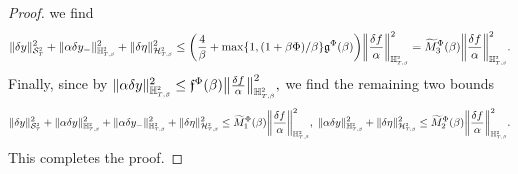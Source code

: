 \documentclass[10pt]{article} %
\newcommand\cH{\mathcal H}
\newcommand\cS{\mathcal S}
\newcommand{\smalltext}[1]{\text{\fontsize{4}{4}\selectfont$#1$}}
\newcommand\ff{\mathfrak f}
\newcommand\fg{\mathfrak g}
\def \H{\mathbb{H}}
\begin{document}
\begin{proof}
	we find
	\begin{equation*}
		\|\delta y\|^2_{\cS^\smalltext{2}_\smalltext{T}} + \|\alpha\delta y_{-}\|^2_{\H^\smalltext{2}_{\smalltext{T}\smalltext{,}\smalltext{\beta}}} + \|\delta\eta\|^2_{\cH^\smalltext{2}_{\smalltext{T}\smalltext{,}\smalltext{\beta}}} \leq \bigg(\frac{4}{\beta} + \max\{1,(1+\beta\Phi)/\beta\}\fg^\Phi(\beta)\bigg) \bigg\|\frac{\delta f}{\alpha}\bigg\|^2_{\H^\smalltext{2}_{\smalltext{T}\smalltext{,}\smalltext{\beta}}} = \widetilde M^\Phi_3(\beta)\bigg\|\frac{\delta f}{\alpha}\bigg\|^2_{\H^\smalltext{2}_{\smalltext{T}\smalltext{,}\smalltext{\beta}}}.
	\end{equation*}
	Finally, since by  $
		\|\alpha \delta y\|^2_{\H^{\smalltext{2}}_{\smalltext{T}\smalltext{,}\smalltext{\beta}}} 
		\leq \ff^\Phi(\beta) \big\| \frac{\delta f}{\alpha} \big\|^2_{\H^{\smalltext{2}}_{\smalltext{T}\smalltext{,}\smalltext{\beta}}},
$
	we find the remaining two bounds
	\begin{equation*}
		\|\delta y\|^2_{\cS^\smalltext{2}_\smalltext{T}} + \|\alpha \delta y\|^2_{\H^{\smalltext{2}}_{\smalltext{T}\smalltext{,}\smalltext{\beta}}} + \|\alpha\delta y_{-}\|^2_{\H^\smalltext{2}_{\smalltext{T}\smalltext{,}\smalltext{\beta}}} + \|\delta\eta\|^2_{\cH^\smalltext{2}_{\smalltext{T}\smalltext{,}\smalltext{\beta}}} 
		\leq \widetilde M^\Phi_1(\beta) \bigg\| \frac{\delta f}{\alpha} \bigg\|^2_{\H^{\smalltext{2}}_{\smalltext{T}\smalltext{,}\smalltext{\beta}}},\;
		\|\alpha \delta y\|^2_{\H^{\smalltext{2}}_{\smalltext{T}\smalltext{,}\smalltext{\beta}}} + \|\delta\eta\|^2_{\cH^\smalltext{2}_{\smalltext{T}\smalltext{,}\smalltext{\beta}}} 
		\leq \widetilde M^\Phi_2(\beta) \bigg\| \frac{\delta f}{\alpha} \bigg\|^2_{\H^{\smalltext{2}}_{\smalltext{T}\smalltext{,}\smalltext{\beta}}}.
	\end{equation*}
	This completes the proof.
\end{proof}
\end{document}
